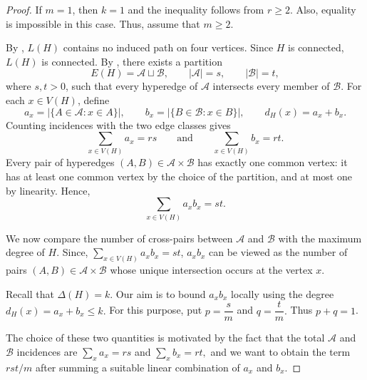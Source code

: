 \documentclass[10pt,a4paper]{amsart}
\begin{document}
\begin{proof}
If $m=1$, then $k=1$ and the inequality follows from $r\geq 2$. Also,
equality is impossible in this case. Thus, assume that $m\geq 2$.

By , $L(H)$ contains no induced path on four
vertices. Since $H$ is connected, $L(H)$ is connected. By
, there exists a partition
$$
E(H)=\mathcal{A}\sqcup\mathcal{B},
\qquad
|\mathcal{A}|=s,
\qquad
|\mathcal{B}|=t,
$$
where $s,t>0$, such that every hyperedge of $\mathcal{A}$ intersects every
member of $\mathcal{B}$. For each $x\in V(H)$, define
$$
a_x=|\{A\in\mathcal{A}:x\in A\}|,
\qquad
b_x=|\{B\in\mathcal{B}:x\in B\}|,
\qquad
d_H(x)=a_x+b_x.
$$
Counting incidences with the two edge classes gives
$$
\sum_{x\in V(H)}a_x=rs
\qquad\text{and}\qquad
\sum_{x\in V(H)}b_x=rt.
$$
Every pair of hyperedges $(A,B)\in\mathcal{A}\times\mathcal{B}$ has exactly one
common vertex: it has at least one common vertex by the choice of the
partition, and at most one by linearity. Hence,
$$
\sum_{x\in V(H)}a_xb_x=st.
$$

We now compare the number of cross-pairs between $\mathcal{A}$ and
$\mathcal{B}$ with the maximum degree of $H$.
Since, $\sum_{x\in V(H)}a_xb_x=st$, $a_xb_x$ can be viewed as the number of pairs
$(A,B)\in\mathcal{A}\times\mathcal{B}$ whose unique intersection occurs
at the vertex $x$.

Recall that $\Delta(H) = k$. Our aim is to bound $a_xb_x$ locally using the degree
    $d_H(x)=a_x+b_x\leq k.$
For this purpose, put
    $p=\dfrac{s}{m}$ and $q=\dfrac{t}{m}.$
Thus $p+q=1$. 

The choice of these two quantities is motivated by the fact
that the total $\mathcal{A}$ and $\mathcal{B}$ incidences are
    $\sum_x a_x=rs$ and $\sum_x b_x=rt,$
and we want to obtain the term $rst/m$ after summing a suitable linear
combination of $a_x$ and $b_x$.


\end{proof}
\end{document}
